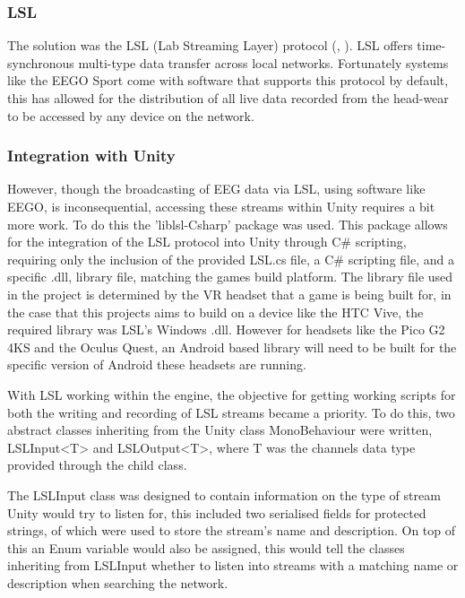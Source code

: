 \documentclass[11pt, a4paper]{article}
\newcommand{\ccite}[1]{(\citeauthor{#1}, \citeyear{#1})}
\begin{document}
\subsubsection{LSL}	

The solution was the LSL (Lab Streaming Layer) protocol \ccite{labstreaminglayer}. LSL offers time-synchronous multi-type data transfer across local networks. Fortunately systems like the EEGO Sport come with software that supports this protocol by default, this has allowed for the distribution of all live data recorded from the head-wear to be accessed by any device on the network.

  
\subsubsection{Integration with Unity}	

However, though the broadcasting of EEG data via LSL, using software like EEGO, is inconsequential, accessing these streams within Unity requires a bit more work. To do this the 'liblsl-Csharp' package was used. This package allows for the integration of the LSL protocol into Unity through C\# scripting, requiring only the inclusion of the provided LSL.cs file, a C\# scripting file, and a specific .dll, library file, matching the games build platform. The library file used in the project is determined by the VR headset that a game is being built for, in the case that this projects aims to build on a device like the HTC Vive, the required library was LSL's Windows .dll. However for headsets like the Pico G2 4KS and the Oculus Quest, an Android based library will need to be built for the specific version of Android these headsets are running. 

\hfill

With LSL working within the engine, the objective for getting working scripts for both the writing and recording of LSL streams became a priority. To do this, two abstract classes inheriting from the Unity class MonoBehaviour were written, LSLInput<T> and LSLOutput<T>, where T was the channels data type provided through the child class. 

\hfill

The LSLInput class was designed to contain information on the type of stream Unity would try to listen for, this included two serialised fields for protected strings, of which were used to store the stream's name and description. On top of this an Enum variable would also be assigned, this would tell the classes inheriting from LSLInput whether to listen into streams with a matching name or description when searching the network.
\end{document}
